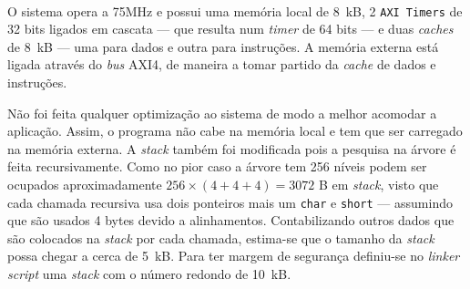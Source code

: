 \paragraph{} O sistema opera a 75MHz e possui uma memória local de 8~kB, 2 \texttt{AXI~Timers} de 32 bits ligados em cascata --- que resulta num \textit{timer} de 64 bits --- e duas \textit{caches} de 8~kB --- uma para dados e outra para instruções. A memória externa está ligada através do \textit{bus} AXI4, de maneira a tomar partido da \textit{cache} de dados e instruções.

Não foi feita qualquer optimização ao sistema de modo a melhor acomodar a aplicação. Assim, o programa não cabe na memória local e tem que ser carregado na memória externa. A \textit{stack} também foi modificada pois a pesquisa na árvore é feita recursivamente. Como no pior caso a árvore tem 256 níveis podem ser ocupados aproximadamente $256 \times (4 + 4 + 4) = 3072$ B em \textit{stack}, visto que cada chamada recursiva usa dois ponteiros mais um \texttt{char} e \texttt{short} --- assumindo que são usados 4 bytes devido a alinhamentos. Contabilizando outros dados que são colocados na \textit{stack} por cada chamada, estima-se que o tamanho da \textit{stack} possa chegar a cerca de 5~kB. Para ter margem de segurança definiu-se no \textit{linker script} uma \textit{stack} com o número redondo de 10~kB.